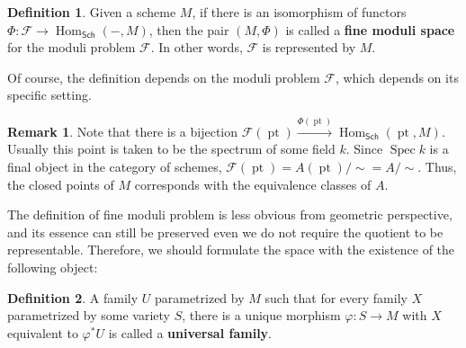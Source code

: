 \documentclass[12pt]{article}
\theoremstyle{remark}
\theoremstyle{definition}
\newtheorem{remark}{Remark}[section]
\newtheorem{definition}{Definition}[section]
\newcommand{\Spec}[0]{\operatorname{Spec}}
\newcommand{\Hom}[0]{\operatorname{Hom}}
\newcommand{\Sch}[0]{\mathsf{Sch}}
\newcommand{\pt}{\operatorname{pt}}
\begin{document}
    \begin{definition}
        Given a scheme $M$, if there is an isomorphism of functors $\Phi:\mathcal F\to\Hom_\Sch(-,M)$, then the pair $(M,\Phi)$ is called a \textbf{fine moduli space} for the moduli problem $\mathcal F$. In other words, $\mathcal F$ is represented by $M$.
    \end{definition}
    Of course, the definition depends on the moduli problem $\mathcal F$, which depends on its specific setting.
    \begin{remark}
        Note that there is a bijection $\mathcal F(\pt)\xrightarrow{\Phi(\pt)} \Hom_\Sch(\pt, M)$. Usually this point is taken to be the spectrum of some field $k$. Since $\Spec k$ is a final object in the category of schemes, $\mathcal F(\pt)=A(\pt)/{\sim}=A/{\sim}$. Thus, the closed points of $M$ corresponds with the equivalence classes of $A$.
    \end{remark}
    The definition of fine moduli problem is less obvious from geometric perspective, and its essence can still be preserved even we do not require the quotient to be representable. Therefore, we should formulate the space with the existence of the following object:
    \begin{definition}
        A family $U$ parametrized by $M$ such that for every family $X$ parametrized by some variety $S$, there is a unique morphism $\varphi:S\to M$ with $X$ equivalent to $\varphi^*U$ is called a \textbf{universal family}.
    \end{definition}
\end{document}
